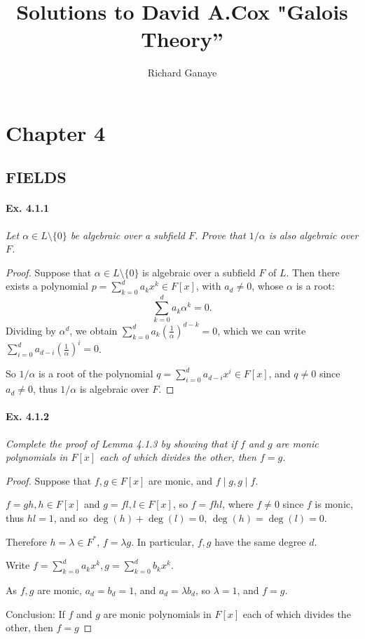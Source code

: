 \documentclass[11pt,a4paper]{article}
\title{Solutions to David A.Cox  "Galois Theory''}
\author{Richard Ganaye}
\begin{document}
\section{Chapter 4}

\subsection{FIELDS}

\paragraph{Ex. 4.1.1}

{\it Let $\alpha \in L \setminus \{0\}$ be algebraic over a subfield $F$. Prove that $1/\alpha$ is also algebraic over $F$.
}

\begin{proof}
Suppose that $\alpha \in L \setminus \{0\}$ is algebraic over a subfield $F$ of $L$. Then there exists a polynomial $p = \sum\limits_{k=0}^d a_k x^k \in F[x]$, with $a_d \neq 0$, whose $\alpha$ is a root:
$$\sum\limits_{k=0}^d a_k \alpha^k = 0.$$
Dividing by $\alpha^d$, we obtain $\sum\limits_{k=0}^d a_k\left(\frac{1}{\alpha}\right)^{d-k} = 0$, which we can write
$\sum\limits_{i=0}^d a_{d-i}\left(\frac{1}{\alpha}\right)^{i} = 0$.

So $1/\alpha$ is a root of the polynomial $q = \sum\limits_{i=0}^d a_{d-i}x^{i} \in F[x]$, and $q\neq 0$ since $a_d \neq0$, thus $1/\alpha$ is algebraic over $F$.
\end{proof}

\paragraph{Ex. 4.1.2}

{\it Complete the proof of Lemma 4.1.3 by showing that if $f$ and $g$ are monic polynomials in $F[x]$ each of which divides the other, then $f=g$.
}

\begin{proof}
Suppose that $f,g \in F[x]$  are monic, and $f\mid g, g\mid f$. 

$f = g h , h\in F[x]$ and $g = f l , l \in F[x]$, so $f = f hl$, where $f\neq 0$ since $f$ is monic, thus $hl=1$, and so $\deg(h)+ \deg(l)=0$, $\deg(h) = \deg(l) = 0$.

Therefore $h = \lambda \in F^*$, $f = \lambda g$. In particular, $f,g$ have the same degree $d$.

Write $f = \sum\limits_{k=0}^d a_k x^k, g =  \sum\limits_{k=0}^d b_k x^k$.

As $f,g$ are monic, $a_d=b_d=1$, and $a_d = \lambda b_d$, so $\lambda=1$, and $f = g$.

Conclusion: If $f$ and $g$ are monic polynomials in $F[x]$ each of which divides the other, then $f=g$
\end{proof}
\end{document}
